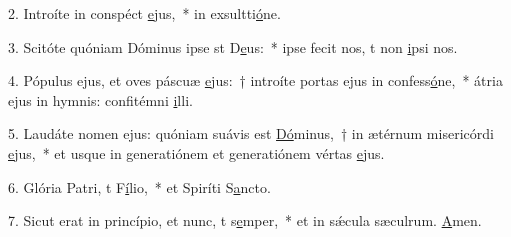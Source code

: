 2. Introíte in conspéct \uline{e}jus,~* in exsultti\uline{ó}ne.\par 
3. Scitóte quóniam Dóminus ipse st D\uline{e}us:~* ipse fecit nos, t non \uline{i}psi nos.\par 
4. Pópulus ejus, et oves páscuæ \uline{e}jus:~† introíte portas ejus in confess\uline{ó}ne,~* átria ejus in hymnis: confitémni \uline{i}lli.\par 
5. Laudáte nomen ejus: quóniam suávis est \uline{Dó}minus,~† in ætérnum misericórdi \uline{e}jus,~* et usque in generatiónem et generatiónem vértas \uline{e}jus.\par 
6. Glória Patri, t F\uline{í}lio,~* et Spiríti S\uline{a}ncto.\par 
7. Sicut erat in princípio, et nunc, t s\uline{e}mper,~* et in sǽcula sæculrum. \uline{A}men.\par 
